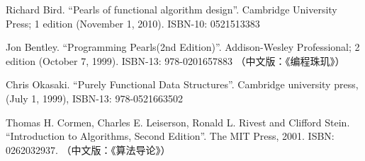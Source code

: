 \documentclass[UTF8]{article}
\begin{document}
\begin{thebibliography}{99}

Richard Bird. ``Pearls of functional algorithm design''. Cambridge University Press; 1 edition (November 1, 2010). ISBN-10: 0521513383

Jon Bentley. ``Programming Pearls(2nd Edition)''. Addison-Wesley Professional; 2 edition (October 7, 1999). ISBN-13: 978-0201657883 （中文版：《编程珠玑》）

Chris Okasaki. ``Purely Functional Data Structures''. Cambridge university press, (July 1, 1999), ISBN-13: 978-0521663502

Thomas H. Cormen, Charles E. Leiserson, Ronald L. Rivest and Clifford Stein. ``Introduction to Algorithms, Second Edition''. The MIT Press, 2001. ISBN: 0262032937. （中文版：《算法导论》）

\end{thebibliography}

\ifx\wholebook\relax \else
\expandafter\enddocument
\fi
\end{document}
